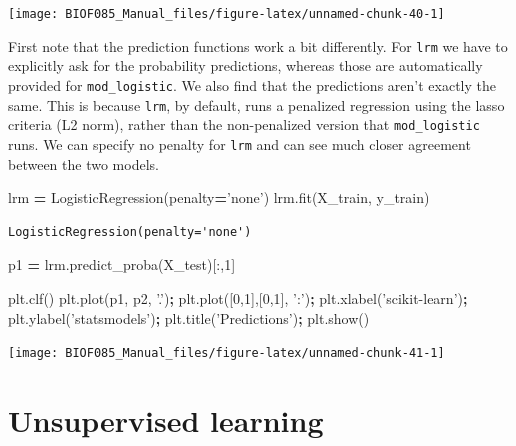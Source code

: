 \documentclass[
  letterpaper,
]{scrbook}
\newenvironment{Shaded}{\begin{snugshade}}{\end{snugshade}}
\newcommand{\DecValTok}[1]{\textcolor[rgb]{0.00,0.00,0.81}{#1}}
\newcommand{\NormalTok}[1]{#1}
\newcommand{\OperatorTok}[1]{\textcolor[rgb]{0.81,0.36,0.00}{\textbf{#1}}}
\newcommand{\StringTok}[1]{\textcolor[rgb]{0.31,0.60,0.02}{#1}}
\begin{document}
\begin{center}\texttt{[image: BIOF085\_Manual\_files/figure-latex/unnamed-chunk-40-1]} \end{center}

First note that the prediction functions work a bit differently. For \texttt{lrm} we have to explicitly ask for the probability predictions, whereas those are automatically provided for \texttt{mod\_logistic}. We also find that the predictions aren't exactly the same. This is because \texttt{lrm}, by default, runs a penalized regression using the lasso criteria (L2 norm), rather than the non-penalized version that \texttt{mod\_logistic} runs. We can specify no penalty for \texttt{lrm} and can see much closer agreement between the two models.

\begin{Shaded}
\begin{Highlighting}[]
\NormalTok{lrm }\OperatorTok{=}\NormalTok{ LogisticRegression(penalty}\OperatorTok{=}\StringTok{'none'}\NormalTok{)}
\NormalTok{lrm.fit(X_train, y_train)}
\end{Highlighting}
\end{Shaded}

\begin{verbatim}
LogisticRegression(penalty='none')
\end{verbatim}

\begin{Shaded}
\begin{Highlighting}[]
\NormalTok{p1 }\OperatorTok{=}\NormalTok{ lrm.predict_proba(X_test)[:,}\DecValTok{1}\NormalTok{]}

\NormalTok{plt.clf()}
\NormalTok{plt.plot(p1, p2, }\StringTok{'.'}\NormalTok{)}\OperatorTok{;}
\NormalTok{plt.plot([}\DecValTok{0}\NormalTok{,}\DecValTok{1}\NormalTok{],[}\DecValTok{0}\NormalTok{,}\DecValTok{1}\NormalTok{], }\StringTok{':'}\NormalTok{)}\OperatorTok{;}
\NormalTok{plt.xlabel(}\StringTok{'scikit-learn'}\NormalTok{)}\OperatorTok{;}
\NormalTok{plt.ylabel(}\StringTok{'statsmodels'}\NormalTok{)}\OperatorTok{;}
\NormalTok{plt.title(}\StringTok{'Predictions'}\NormalTok{)}\OperatorTok{;}
\NormalTok{plt.show()}
\end{Highlighting}
\end{Shaded}

\begin{center}\texttt{[image: BIOF085\_Manual\_files/figure-latex/unnamed-chunk-41-1]} \end{center}

\hypertarget{unsupervised-learning}{%
\section{Unsupervised learning}\label{unsupervised-learning}}
\end{document}
